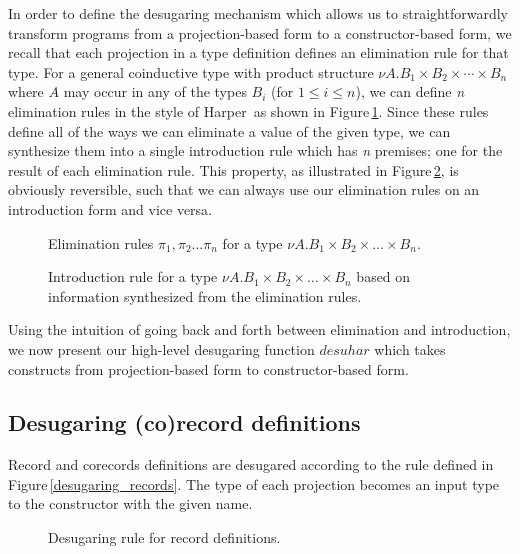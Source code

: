In order to define the desugaring mechanism which allows us to straightforwardly transform programs from a projection-based form to a constructor-based form, we recall that each projection in a type definition defines an elimination rule for that type. For a general coinductive type with product structure $\nu A. B_1 \times B_2 \times \cdots \times B_n$ where $A$ may occur in any of the types $B_i$ (for $1 \leq i \leq n$), we can define \textit{n} elimination rules in the style of Harper\,\cite[Ch. 15]{Harper:2012} as shown in Figure\,\ref{fig:nuA_elim_rules}. Since these rules define all of the ways we can eliminate a value of the given type, we can synthesize them into a single introduction rule which has \textit{n} premises; one for the result of each elimination rule. This property, as illustrated in Figure\,\ref{fig:nuA_intro_rule}, is obviously reversible, such that we can always use our elimination rules on an introduction form and vice versa.

\begin{figure}
\caption{Elimination rules $\pi_1, \pi_2 \ldots \pi_n$ for a type $\nu A. B_1 \times B_2 \times \ldots \times B_n$.}
\label{fig:nuA_elim_rules}
\end{figure}

\begin{figure}
\caption{Introduction rule for a type $\nu A. B_1 \times B_2 \times \ldots \times B_n$ based on information synthesized from the elimination rules.}
\label{fig:nuA_intro_rule}
\end{figure}

Using the intuition of going back and forth between elimination and introduction, we now present our high-level desugaring function $desuhar$ which takes constructs from projection-based form to constructor-based form.



\subsection{Desugaring (co)record definitions}
Record and corecords definitions are desugared according to the rule defined in Figure\,\ref{desugaring_records}. The type of each projection becomes an input type to the constructor with the given name.

\begin{figure}
\caption{Desugaring rule for record definitions.}
\label{fig:desugaring_records}
\end{figure}

